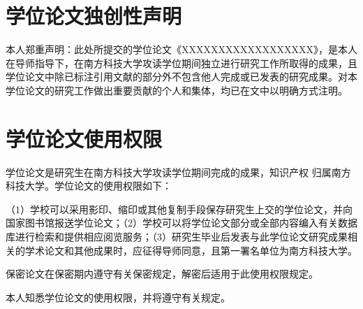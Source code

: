 \begin{statementcopyright}
  \section*{学位论文独创性声明}
  \vspace{1em}

  \begin{spacing}{1.25}
    本人郑重声明：此处所提交的学位论文《XXXXXXXXXXXXXXXXXX》，是本人在导师指导下，在南方科技大学攻读学位期间独立进行研究工作所取得的成果，且学位论文中除已标注引用文献的部分外不包含他人完成或已发表的研究成果。对本学位论文的研究工作做出重要贡献的个人和集体，均已在文中以明确方式注明。
  \end{spacing}

  \authorsign

  \section*{学位论文使用权限}
  \vspace{1em}

  \begin{spacing}{1.25}
  学位论文是研究生在南方科技大学攻读学位期间完成的成果，知识产权
  归属南方科技大学。学位论文的使用权限如下：

  （1）学校可以采用影印、缩印或其他复制手段保存研究生上交的学位论文，并向国家图书馆报送学位论文；（2）学校可以将学位论文部分或全部内容编入有关数据库进行检索和提供相应阅览服务；（3）研究生毕业后发表与此学位论文研究成果相关的学术论文和其他成果时，应征得导师同意，且第一署名单位为南方科技大学。

  保密论文在保密期内遵守有关保密规定，解密后适用于此使用权限规定。

  本人知悉学位论文的使用权限，并将遵守有关规定。
  \end{spacing}

  \authorsupervisorsign

\end{statementcopyright}